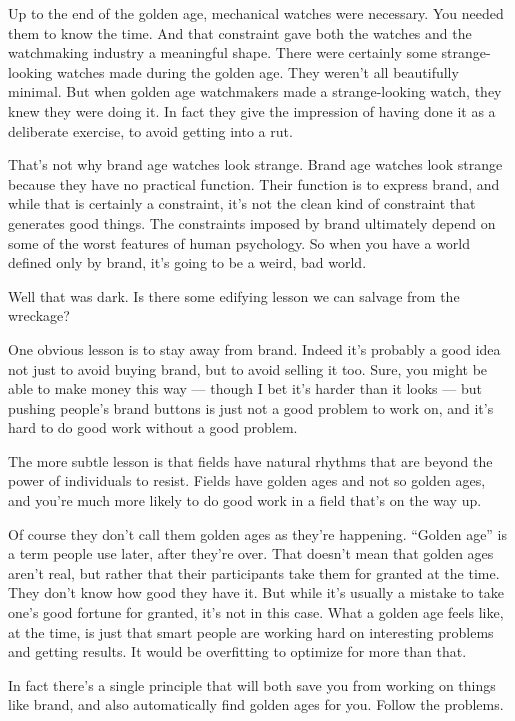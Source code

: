 Up to the end of the golden age, mechanical watches were necessary. You
needed them to know the time. And that constraint gave both the watches
and the watchmaking industry a meaningful shape. There were certainly
some strange-looking watches made during the golden age. They weren't
all beautifully minimal. But when golden age watchmakers made a
strange-looking watch, they knew they were doing it. In fact they give
the impression of having done it as a deliberate exercise, to avoid
getting into a rut.

That's not why brand age watches look strange. Brand age watches look
strange because they have no practical function. Their function is to
express brand, and while that is certainly a constraint, it's not the
clean kind of constraint that generates good things. The constraints
imposed by brand ultimately depend on some of the worst features of
human psychology. So when you have a world defined only by brand, it's
going to be a weird, bad world.

Well that was dark. Is there some edifying lesson we can salvage from
the wreckage?

One obvious lesson is to stay away from brand. Indeed it's probably a
good idea not just to avoid buying brand, but to avoid selling it too.
Sure, you might be able to make money this way --- though I bet it's
harder than it looks --- but pushing people's brand buttons is just not
a good problem to work on, and it's hard to do good work without a good
problem.

The more subtle lesson is that fields have natural rhythms that are
beyond the power of individuals to resist. Fields have golden ages and
not so golden ages, and you're much more likely to do good work in a
field that's on the way up.

Of course they don't call them golden ages as they're happening.
``Golden age'' is a term people use later, after they're over. That
doesn't mean that golden ages aren't real, but rather that their
participants take them for granted at the time. They don't know how good
they have it. But while it's usually a mistake to take one's good
fortune for granted, it's not in this case. What a golden age feels
like, at the time, is just that smart people are working hard on
interesting problems and getting results. It would be overfitting to
optimize for more than that.

In fact there's a single principle that will both save you from working
on things like brand, and also automatically find golden ages for you.
Follow the problems.

